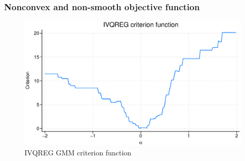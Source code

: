 \documentclass[11pt]{beamer}
\begin{document}
\begin{frame}
\frametitle{Nonconvex and non-smooth objective function}
\begin{figure}
\centering
\includegraphics[scale=0.6]{eps/ivqreg_obj}
\caption{IVQREG GMM criterion function}
\end{figure}
\end{frame}
\end{document}
